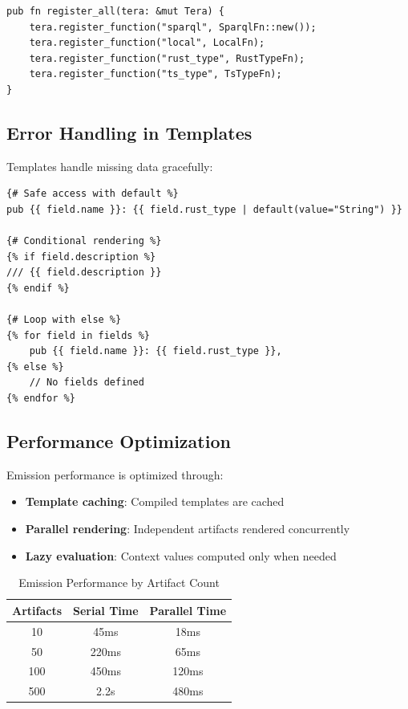 \begin{verbatim}
pub fn register_all(tera: &mut Tera) {
    tera.register_function("sparql", SparqlFn::new());
    tera.register_function("local", LocalFn);
    tera.register_function("rust_type", RustTypeFn);
    tera.register_function("ts_type", TsTypeFn);
}
\end{verbatim}

\subsection{Error Handling in Templates}

Templates handle missing data gracefully:

\begin{verbatim}
{# Safe access with default %}
pub {{ field.name }}: {{ field.rust_type | default(value="String") }}

{# Conditional rendering %}
{% if field.description %}
/// {{ field.description }}
{% endif %}

{# Loop with else %}
{% for field in fields %}
    pub {{ field.name }}: {{ field.rust_type }},
{% else %}
    // No fields defined
{% endfor %}
\end{verbatim}

\subsection{Performance Optimization}

Emission performance is optimized through:
\begin{itemize}
    \item \textbf{Template caching}: Compiled templates are cached
    \item \textbf{Parallel rendering}: Independent artifacts rendered concurrently
    \item \textbf{Lazy evaluation}: Context values computed only when needed
\end{itemize}

\begin{table}[h]
\centering
\caption{Emission Performance by Artifact Count}
\begin{tabular}{ccc}
\toprule
\textbf{Artifacts} & \textbf{Serial Time} & \textbf{Parallel Time} \\
\midrule
10 & 45ms & 18ms \\
50 & 220ms & 65ms \\
100 & 450ms & 120ms \\
500 & 2.2s & 480ms \\
\bottomrule
\end{tabular}
\end{table}

